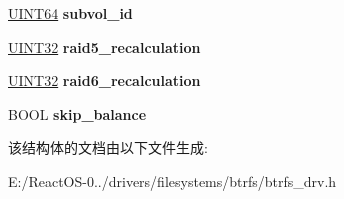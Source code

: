 \begin{DoxyCompactItemize}
\item 
\mbox{\label{structmount__options_ac1644ab6b03d9c02b0073301aadff6d8}} 
\hyperlink{_processor_bind_8h_a57be03562867144161c1bfee95ca8f7c}{U\+I\+N\+T64} {\bfseries subvol\+\_\+id}
\item 
\mbox{\label{structmount__options_a45b253367bba4615a87878bc4f5b394e}} 
\hyperlink{_processor_bind_8h_ae1e6edbbc26d6fbc71a90190d0266018}{U\+I\+N\+T32} {\bfseries raid5\+\_\+recalculation}
\item 
\mbox{\label{structmount__options_a8f3ec33b88f8a0ec2a7ab832ee3ddc16}} 
\hyperlink{_processor_bind_8h_ae1e6edbbc26d6fbc71a90190d0266018}{U\+I\+N\+T32} {\bfseries raid6\+\_\+recalculation}
\item 
\mbox{\label{structmount__options_a2cb36dc016a490f1e131313bb6a5aea9}} 
B\+O\+OL {\bfseries skip\+\_\+balance}
\end{DoxyCompactItemize}


该结构体的文档由以下文件生成\+:\begin{DoxyCompactItemize}
\item 
E\+:/\+React\+O\+S-\/0../drivers/filesystems/btrfs/btrfs\+\_\+drv.\+h\end{DoxyCompactItemize}
